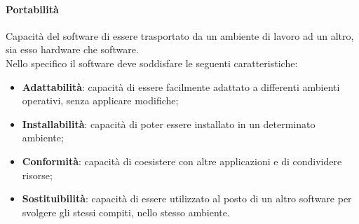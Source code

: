 		\paragraph{Portabilità}
		Capacità del software di essere trasportato da un ambiente di lavoro ad un altro, sia esso hardware che software.\\
		Nello specifico il software deve soddisfare le seguenti caratteristiche:
		\begin{itemize}
			\item \textbf{Adattabilità}:
			capacità di essere facilmente adattato a differenti ambienti operativi, senza applicare modifiche;
			\item \textbf{Installabilità}: capacità di poter essere installato in un determinato ambiente;
			\item \textbf{Conformità}: capacità di coesistere con altre applicazioni e di condividere risorse;
			\item \textbf{Sostituibilità}: capacità di essere utilizzato al posto di un altro software per svolgere gli stessi compiti, nello stesso ambiente.
		\end{itemize}
